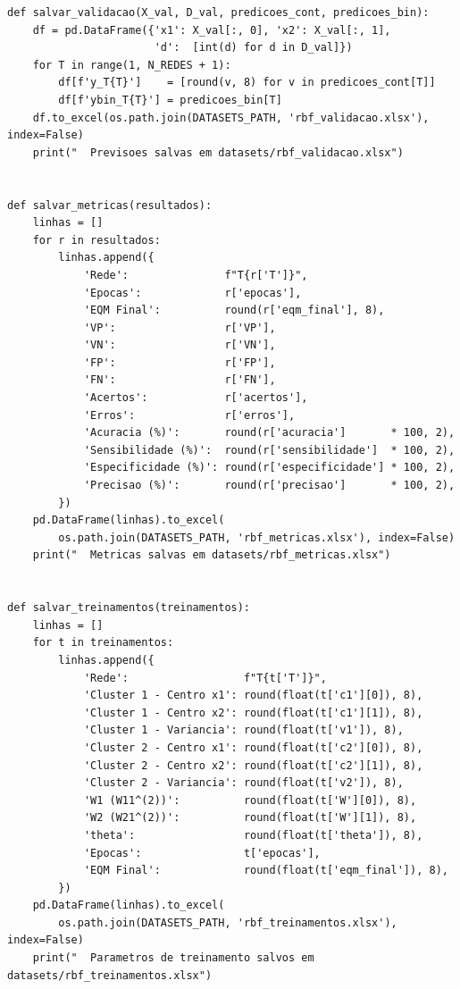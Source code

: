 \documentclass[article, 12pt, oneside, a4paper, section = TITLE, brazil]{abntex2}
\begin{document}
\begin{lstlisting}
def salvar_validacao(X_val, D_val, predicoes_cont, predicoes_bin):
    df = pd.DataFrame({'x1': X_val[:, 0], 'x2': X_val[:, 1],
                       'd':  [int(d) for d in D_val]})
    for T in range(1, N_REDES + 1):
        df[f'y_T{T}']    = [round(v, 8) for v in predicoes_cont[T]]
        df[f'ybin_T{T}'] = predicoes_bin[T]
    df.to_excel(os.path.join(DATASETS_PATH, 'rbf_validacao.xlsx'), index=False)
    print("  Previsoes salvas em datasets/rbf_validacao.xlsx")


def salvar_metricas(resultados):
    linhas = []
    for r in resultados:
        linhas.append({
            'Rede':               f"T{r['T']}",
            'Epocas':             r['epocas'],
            'EQM Final':          round(r['eqm_final'], 8),
            'VP':                 r['VP'],
            'VN':                 r['VN'],
            'FP':                 r['FP'],
            'FN':                 r['FN'],
            'Acertos':            r['acertos'],
            'Erros':              r['erros'],
            'Acuracia (%)':       round(r['acuracia']       * 100, 2),
            'Sensibilidade (%)':  round(r['sensibilidade']  * 100, 2),
            'Especificidade (%)': round(r['especificidade'] * 100, 2),
            'Precisao (%)':       round(r['precisao']       * 100, 2),
        })
    pd.DataFrame(linhas).to_excel(
        os.path.join(DATASETS_PATH, 'rbf_metricas.xlsx'), index=False)
    print("  Metricas salvas em datasets/rbf_metricas.xlsx")


def salvar_treinamentos(treinamentos):
    linhas = []
    for t in treinamentos:
        linhas.append({
            'Rede':                  f"T{t['T']}",
            'Cluster 1 - Centro x1': round(float(t['c1'][0]), 8),
            'Cluster 1 - Centro x2': round(float(t['c1'][1]), 8),
            'Cluster 1 - Variancia': round(float(t['v1']), 8),
            'Cluster 2 - Centro x1': round(float(t['c2'][0]), 8),
            'Cluster 2 - Centro x2': round(float(t['c2'][1]), 8),
            'Cluster 2 - Variancia': round(float(t['v2']), 8),
            'W1 (W11^(2))':          round(float(t['W'][0]), 8),
            'W2 (W21^(2))':          round(float(t['W'][1]), 8),
            'theta':                 round(float(t['theta']), 8),
            'Epocas':                t['epocas'],
            'EQM Final':             round(float(t['eqm_final']), 8),
        })
    pd.DataFrame(linhas).to_excel(
        os.path.join(DATASETS_PATH, 'rbf_treinamentos.xlsx'), index=False)
    print("  Parametros de treinamento salvos em datasets/rbf_treinamentos.xlsx")



\end{lstlisting}
\end{document}
